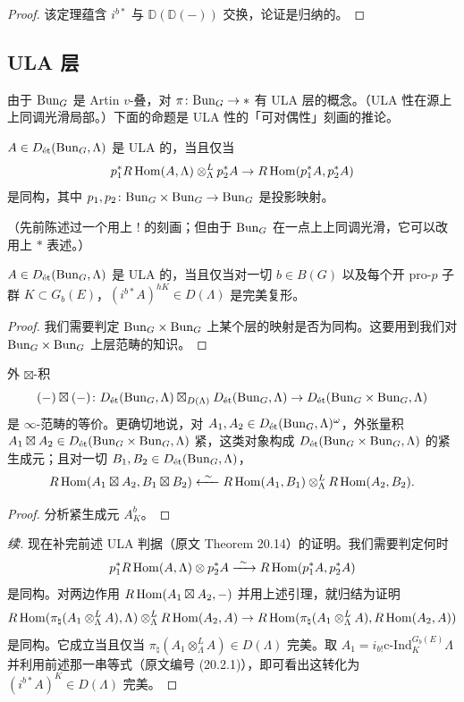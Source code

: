 \begin{proof}
该定理蕴含 $i^{b*}$ 与 $\mathbb{D}(\mathbb{D}(-))$ 交换，论证是归纳的。
\end{proof}

\subsection{ULA 层}

由于 $\Bun_G$ 是 Artin $v$-叠，对 $\pi\colon\Bun_G\to\ast$ 有 ULA 层的概念。（ULA 性在源上上同调光滑局部。）下面的命题是 ULA 性的「可对偶性」刻画的推论。

\begin{proposition}
$A\in D_{\et}(\Bun_G,\Lambda)$ 是 ULA 的，当且仅当
\[
p_1^*R\Hom(A,\Lambda)\otimes^L_\Lambda p_2^*A\to R\Hom(p_1^*A,p_2^*A)
\]
是同构，其中 $p_1,p_2\colon\Bun_G\times\Bun_G\to\Bun_G$ 是投影映射。
\end{proposition}

（先前陈述过一个用上 $!$ 的刻画；但由于 $\Bun_G$ 在一点上上同调光滑，它可以改用上 $*$ 表述。）

\begin{theorem}
$A\in D_{\et}(\Bun_G,\Lambda)$ 是 ULA 的，当且仅当对一切 $b\in B(G)$ 以及每个开 pro-$p$ 子群 $K\subset G_b(E)$，$(i^{b*}A)^{hK}\in D(\Lambda)$ 是完美复形。
\end{theorem}

\begin{proof}
我们需要判定 $\Bun_G\times\Bun_G$ 上某个层的映射是否为同构。这要用到我们对 $\Bun_G\times\Bun_G$ 上层范畴的知识。
\end{proof}

\begin{lemma}
外 $\boxtimes$-积
\[
(-)\boxtimes(-)\colon D_{\et}(\Bun_G,\Lambda)\boxtimes_{D(\Lambda)}D_{\et}(\Bun_G,\Lambda)\to D_{\et}(\Bun_G\times\Bun_G,\Lambda)
\]
%
是 $\infty$-范畴的等价。更确切地说，对 $A_1,A_2\in D_{\et}(\Bun_G,\Lambda)^\omega$，外张量积 $A_1\boxtimes A_2\in D_{\et}(\Bun_G\times\Bun_G,\Lambda)$ 紧，这类对象构成 $D_{\et}(\Bun_G\times\Bun_G,\Lambda)$ 的紧生成元；且对一切 $B_1,B_2\in D_{\et}(\Bun_G,\Lambda)$，
\[
R\Hom(A_1\boxtimes A_2,B_1\boxtimes B_2)\xleftarrow{\ \sim\ }R\Hom(A_1,B_1)\otimes^L_\Lambda R\Hom(A_2,B_2).
\]
\end{lemma}

\begin{proof}
分析紧生成元 $A^b_K$。
\end{proof}

\begin{proof}[续]
现在补完前述 ULA 判据（原文 Theorem 20.14）的证明。我们需要判定何时
\[
p_1^*R\Hom(A,\Lambda)\otimes p_2^*A\xrightarrow{\ \sim\ }R\Hom(p_1^*A,p_2^*A)
\]
是同构。对两边作用 $R\Hom(A_1\boxtimes A_2,-)$ 并用上述引理，就归结为证明
\[
R\Hom(\pi_\natural(A_1\otimes^L_\Lambda A),\Lambda)\otimes^L_\Lambda R\Hom(A_2,A)\to R\Hom(\pi_\natural(A_1\otimes^L_\Lambda A),R\Hom(A_2,A))
\]
是同构。它成立当且仅当 $\pi_\natural(A_1\otimes^L_\Lambda A)\in D(\Lambda)$ 完美。取 $A_1=i_{b!}\mathrm{c}\text{-}\mathrm{Ind}^{G_b(E)}_K\Lambda$ 并利用前述那一串等式（原文编号 (20.2.1)），即可看出这转化为 $(i^{b*}A)^K\in D(\Lambda)$ 完美。
\end{proof}
